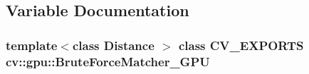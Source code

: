 \subsection{Variable Documentation}
\hypertarget{namespacecv_1_1gpu_acbc5d694c0272fc1b8252c4f9886dbee}{
\subsubsection[{Brute\-Force\-Matcher\-\_\-\-G\-P\-U}]{\setlength{\rightskip}{0pt plus 5cm}template$<$class Distance $>$ class {\bf C\-V\-\_\-\-E\-X\-P\-O\-R\-T\-S} cv\-::gpu\-::\-Brute\-Force\-Matcher\-\_\-\-G\-P\-U}}\label{namespacecv_1_1gpu_acbc5d694c0272fc1b8252c4f9886dbee}
